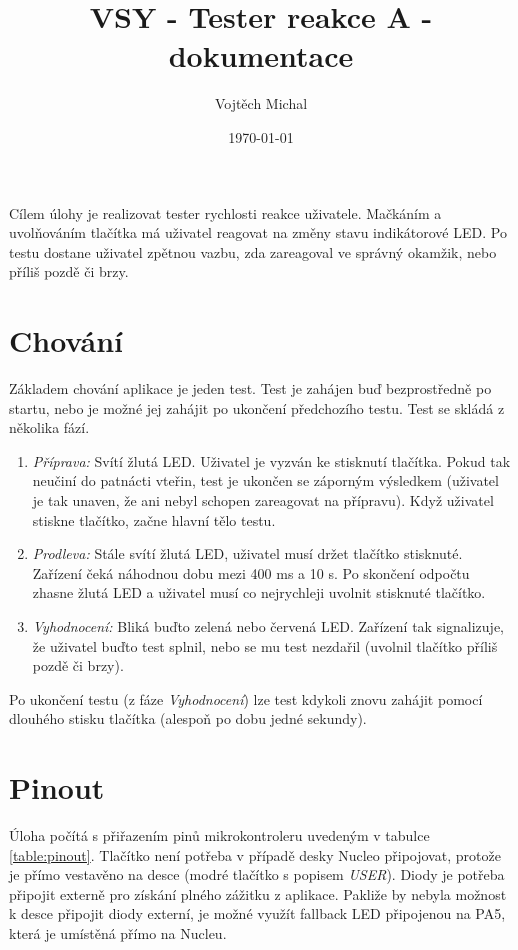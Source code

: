 \documentclass[twoside]{article}
\title{VSY - Tester reakce A - dokumentace}
\author{Vojtěch Michal}
\date{\today}
\begin{document}
\maketitle

Cílem úlohy je realizovat tester rychlosti reakce uživatele. Mačkáním a uvolňováním tlačítka má uživatel reagovat na změny stavu indikátorové LED.
Po testu dostane uživatel zpětnou vazbu, zda zareagoval ve správný okamžik, nebo příliš pozdě či brzy.

\section{Chování}
\label{sec:chovani}

Základem chování aplikace je jeden test. Test je zahájen buď bezprostředně po startu, nebo je možné jej zahájit po ukončení předchozího testu. Test se skládá z několika fází.
\begin{enumerate}
    \item \textit{Příprava:} Svítí žlutá LED. Uživatel je vyzván ke stisknutí tlačítka. Pokud tak neučiní do patnácti vteřin, test je ukončen se záporným výsledkem 
    (uživatel je tak unaven, že ani nebyl schopen zareagovat na přípravu). Když uživatel stiskne tlačítko, začne hlavní tělo testu.
    \item \textit{Prodleva:} Stále svítí žlutá LED, uživatel musí držet tlačítko stisknuté. Zařízení čeká náhodnou dobu mezi 400 ms a 10 s. 
    Po skončení odpočtu zhasne žlutá LED a uživatel musí co nejrychleji uvolnit stisknuté tlačítko.
    \item \textit{Vyhodnocení:} Bliká buďto zelená nebo červená LED. Zařízení tak signalizuje, že uživatel buďto test splnil, nebo se mu test nezdařil
    (uvolnil tlačítko příliš pozdě či brzy).
\end{enumerate}

Po ukončení testu (z fáze \textit{Vyhodnocení}) lze test kdykoli znovu zahájit pomocí dlouhého stisku tlačítka (alespoň po dobu jedné sekundy).



\section{Pinout}

Úloha počítá s přiřazením pinů mikrokontroleru uvedeným v tabulce \ref{table:pinout}. Tlačítko není potřeba v případě desky Nucleo připojovat,
protože je přímo vestavěno na desce (modré tlačítko s popisem \textit{USER}).
Diody je potřeba připojit externě pro získání plného zážitku z aplikace. Pakliže by nebyla možnost k desce připojit diody externí,
je možné využít fallback LED připojenou na PA5, která je umístěná přímo na Nucleu.
\end{document}
